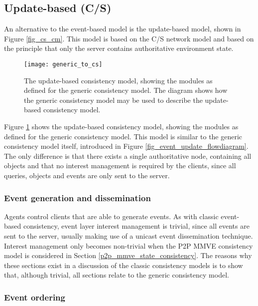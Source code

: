 \subsection{Update-based (C/S)}
\label{classic_update_based}

An alternative to the event-based model is the update-based model, shown in Figure \ref{fig_cs_cm}. This model is based on the C/S network model and based on the principle that only the server contains authoritative environment state.

\begin{figure}[htbp]
 \centering
 \texttt{[image: generic\_to\_cs]}
 \caption{The update-based consistency model, showing the modules as defined for the generic consistency model. The diagram shows how the generic consistency model may be used to describe the update-based consistency model.}
 \label{fig_generic_to_cs}
\end{figure}
%
Figure \ref{fig_generic_to_cs} shows the update-based consistency model, showing the modules as defined for the generic consistency model. This model is similar to the generic consistency model itself, introduced in Figure \ref{fig_event_update_flowdiagram}. The only difference is that there exists a single authoritative node, containing all objects and that no interest management is required by the clients, since all queries, objects and events are only sent to the server.

\subsubsection{Event generation and dissemination}
Agents control clients that are able to generate events. As with classic event-based consistency, event layer interest management is trivial, since all events are sent to the server, usually making use of a unicast event dissemination technique. Interest management only becomes non-trivial when the P2P MMVE consistency model is considered in Section \ref{p2p_mmve_state_consistency}. The reasons why these sections exist in a discussion of the classic consistency models is to show that, although trivial, all sections relate to the generic consistency model.

\subsubsection{Event ordering}
\label{cs_event_ordering}


